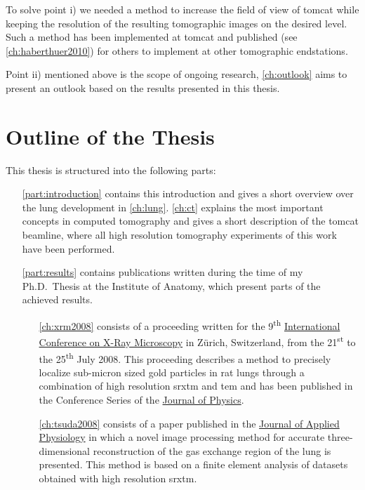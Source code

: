 To solve point i) we needed a method to increase the field of view of \ac{tomcat} while keeping the resolution of the resulting tomographic images on the desired level. Such a method has been implemented at \ac{tomcat} and published (see \autoref{ch:haberthuer2010}) for others to implement at other tomographic endstations.

Point ii) mentioned above is the scope of ongoing research, \autoref{ch:outlook} aims to present an outlook based on the results presented in this thesis. 

\section{Outline of the Thesis}
This thesis is structured into the following parts:
\begin{itemize}
	\item [\autoref{part:introduction}] contains this introduction and gives a short overview over the lung development in \autoref{ch:lung}. \autoref{ch:ct} explains the most important concepts in computed tomography and gives a short description of the \acf{tomcat} beamline, where all high resolution tomography experiments of this work have been performed.
	\item [\autoref{part:results}] contains publications written during the time of my Ph.D.\ Thesis at the Institute of Anatomy, which present parts of the achieved results.
	\begin{itemize}
		\item [\autoref{ch:xrm2008}] consists of a proceeding written for the 9\textsuperscript{th} \href{http://xrm2008.web.psi.ch/}{International Conference on X-Ray Microscopy} in Zürich, Switzerland, from the 21\textsuperscript{st} to the 25\textsuperscript{th} July 2008. This proceeding describes a method to precisely localize sub-micron sized gold particles in rat lungs through a combination of high resolution \acl{srxtm} and \acl{tem} and has been published in the Conference Series of the \href{http://iopscience.iop.org/1742-6596/}{Journal of Physics}.
		
		\item [\autoref{ch:tsuda2008}] consists of a paper published in the \href{http://jap.physiology.org/}{Journal of Applied Physiology} in which a novel image processing method for accurate three-dimensional reconstruction of the gas exchange region of the lung is presented. This method is based on a finite element analysis of datasets obtained with high resolution \acl{srxtm}.


\end{itemize}
\end{itemize}
